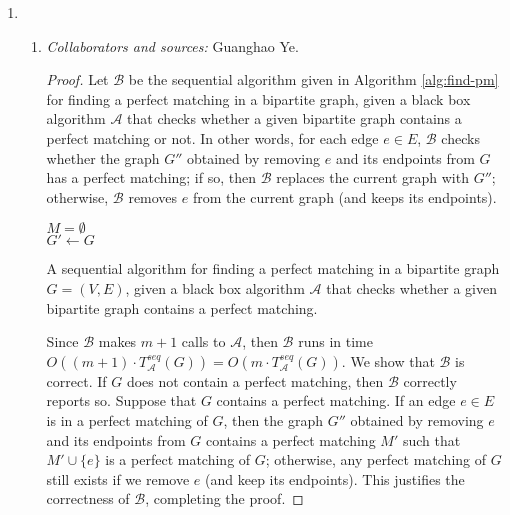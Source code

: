 \documentclass[letterpaper, reqno,11pt]{article}
\begin{document}
\begin{enumerate}
  \clearpage
  
  \item \begin{enumerate}
    \item \noindent\emph{Collaborators and sources:} Guanghao Ye.

    \bigskip

    \begin{proof}
      Let $\mathcal B$ be the sequential algorithm given in Algorithm \ref{alg:find-pm} for finding a perfect matching in a bipartite graph, given a black box algorithm $\mathcal A$ that checks whether a given bipartite graph contains a perfect matching or not. In other words, for each edge $e \in E$, $\mathcal B$ checks whether the graph $G''$ obtained by removing $e$ and its endpoints from $G$ has a perfect matching; if so, then $\mathcal B$ replaces the current graph with $G''$; otherwise, $\mathcal B$ removes $e$ from the current graph (and keeps its endpoints).

      \begin{algorithm}
        $M = \emptyset$ \\
        $G' \leftarrow G$ \\
        \caption{A sequential algorithm for finding a perfect matching in a bipartite graph $G = (V, E)$, given a black box algorithm $\mathcal A$ that checks whether a given bipartite graph contains a perfect matching.}
        \label{alg:find-pm}
      \end{algorithm}

      Since $\mathcal B$ makes $m + 1$ calls to $\mathcal A$, then $\mathcal B$ runs in time $O((m + 1) \cdot T_{\mathcal A}^\textit{seq}(G)) = O(m \cdot T_{\mathcal A}^\textit{seq}(G))$. We show that $\mathcal B$ is correct. If $G$ does not contain a perfect matching, then $\mathcal B$ correctly reports so. Suppose that $G$ contains a perfect matching. If an edge $e \in E$ is in a perfect matching of $G$, then the graph $G''$ obtained by removing $e$ and its endpoints from $G$ contains a perfect matching $M'$ such that $M' \cup \{ e \}$ is a perfect matching of $G$; otherwise, any perfect matching of $G$ still exists if we remove $e$ (and keep its endpoints). This justifies the correctness of $\mathcal B$, completing the proof.
    \end{proof}


\end{enumerate}
\end{enumerate}
\end{document}
